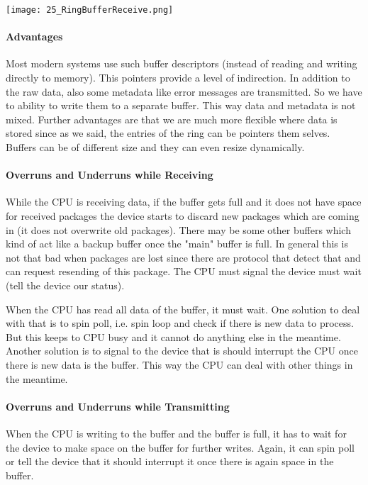 \texttt{[image: 25\_RingBufferReceive.png]}

\paragraph{Advantages}
Most modern systems use such buffer descriptors (instead of reading and writing directly to memory). This pointers provide a level of indirection. In addition to the raw data, also some metadata like error messages are transmitted. So we have to ability to write them to a separate buffer. This way data and metadata is not mixed. Further advantages are that we are much more flexible where data is stored since as we said, the entries of the ring can be pointers them selves. Buffers can be of different size and they can even resize dynamically.

\paragraph{Overruns and Underruns while Receiving}
While the CPU is receiving data, if the buffer gets full and it does not have space for received packages the device starts to discard new packages which are coming in (it does not overwrite old packages). There may be some other buffers which kind of act like a backup buffer once the "main" buffer is full. In general this is not that bad when packages are lost since there are protocol that detect that and can request resending of this package. The CPU must signal the device must wait (tell the device our status).

When the CPU has read all data of the buffer, it must wait. One solution to deal with that is to spin poll, i.e. spin loop and check if there is new data to process. But this keeps to CPU busy and it cannot do anything else in the meantime. Another solution is to signal to the device that is should interrupt the CPU once there is new data is the buffer. This way the CPU can deal with other things in the meantime.

\paragraph{Overruns and Underruns while Transmitting}
When the CPU is writing to the buffer and the buffer is full, it has to wait for the device to make space on the buffer for further writes. Again, it can spin poll or tell the device that it should interrupt it once there is again space in the buffer.


